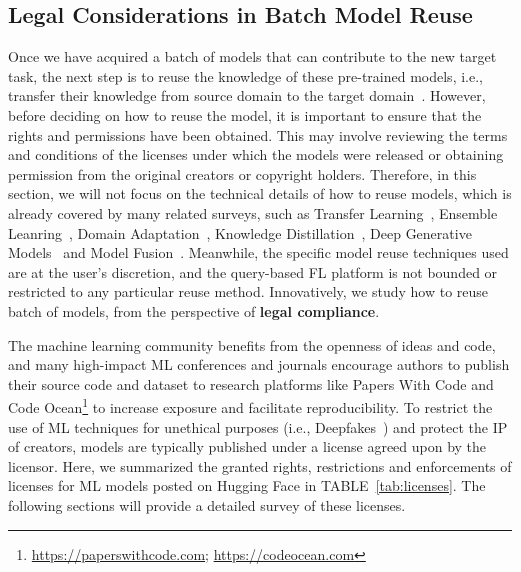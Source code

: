 \subsection{Legal Considerations in Batch Model Reuse}
\label{sec:how2reuse}
Once we have acquired a batch of models that can contribute to the new target task, the next step is to reuse the knowledge of these pre-trained models, i.e., transfer their knowledge from source domain to the target domain~\cite{pan2009survey}.
However, before deciding on how to reuse the model, it is important to ensure that the rights and permissions have been obtained. 
This may involve reviewing the terms and conditions of the licenses under which the models were released or obtaining permission from the original creators or copyright holders.
Therefore, in this section, we will not focus on the technical details of how to reuse models, which is already covered by many related surveys, such as Transfer Learning~\cite{pan2009survey}, Ensemble Leanring~\cite{zhou2012ensemble}, Domain Adaptation~\cite{wang2018deep}, Knowledge Distillation~\cite{wang2021knowledge}, Deep Generative Models~\cite{cao2022survey} and Model Fusion~\cite{ji2021emerging}.
Meanwhile, the specific model reuse techniques used are at the user's discretion, and the query-based FL platform is not bounded or restricted to any particular reuse method.
Innovatively, we study how to reuse batch of models, from the perspective of \textbf{legal compliance}.

The machine learning community benefits from the openness of ideas and code, and many high-impact ML conferences and journals encourage authors to publish their source code and dataset to research platforms like Papers With Code and Code Ocean\footnote{\url{https://paperswithcode.com}; \url{https://codeocean.com}} to increase exposure and facilitate reproducibility.
To restrict the use of ML techniques for unethical purposes (i.e., Deepfakes~\cite{mirsky2021creation}) and protect the IP of creators, models are typically published under a license agreed upon by the licensor.
Here, we summarized the granted rights, restrictions and enforcements of licenses for ML models posted on Hugging Face in TABLE~\ref{tab:licenses}.
The following sections will provide a detailed survey of these licenses.


